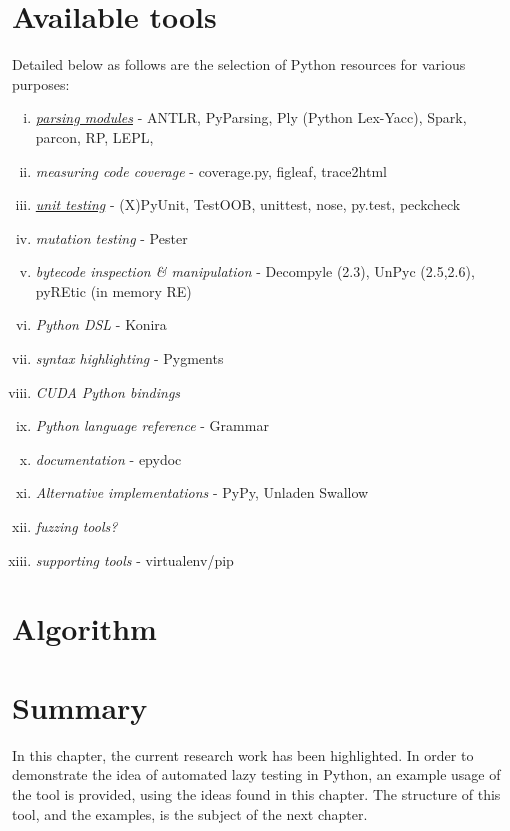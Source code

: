 \documentclass{icldt}
\numberwithin{equation}{section}       %
\begin{document}
\section*{Available tools}
Detailed below as follows are the selection of Python resources for various purposes:
\begin{enumerate}[i.]
	\item \emph{\href{http://wiki.python.org/moin/LanguageParsing}{parsing modules}} - ANTLR, PyParsing, Ply (Python Lex-Yacc), Spark, parcon, RP, LEPL, 
	\item \emph{measuring code coverage} - coverage.py, figleaf, trace2html
	\item \emph{\href{http://wiki.python.org/moin/PythonTestingToolsTaxonomy}{unit testing}} - (X)PyUnit, TestOOB, unittest, nose, py.test, peckcheck
	\item \emph{mutation testing} - Pester
	\item \emph{bytecode inspection \& manipulation} - Decompyle (2.3), UnPyc (2.5,2.6), pyREtic (in memory RE)
	\item \emph{Python DSL} - Konira
	\item \emph{syntax highlighting} - Pygments
	\item \emph{CUDA Python bindings}
	\item \emph{Python language reference} - Grammar
	\item \emph{documentation} - epydoc
	\item \emph{Alternative implementations} - PyPy, Unladen Swallow
	\item \emph{fuzzing tools?}
	\item \emph{supporting tools} - virtualenv/pip
\end{enumerate}
\section{Algorithm}
\section{Summary}
In this chapter, the current research work has been highlighted. In order to demonstrate the idea of automated lazy testing in Python, an example usage of the tool is provided, using the ideas found in this chapter. The structure of this tool, and the examples, is the subject of the next chapter.
\end{document}
